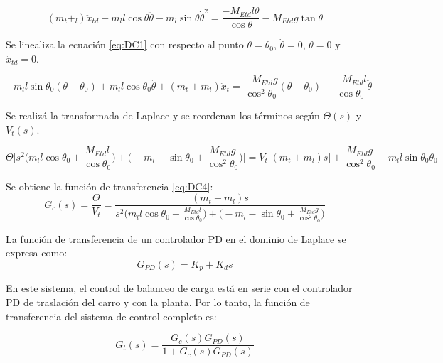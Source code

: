 \documentclass{article}
\begin{document}
        \begin{equation} \label{eq:DC1}
            (m_t+_l)\ddot{x}_{td}+m_ll\cos{\theta}\ddot{\theta}-m_l\sin{\theta}\dot{\theta}^2=\frac{-M_{Etd}l\ddot{\theta}}{\cos{\theta}}-M_{Etd}g\tan{\theta}
        \end{equation}

        Se linealiza la ecuación \ref{eq:DC1} con respecto al punto \(\theta=\theta_0\), \(\dot{\theta}=0\), \(\ddot{\theta}=0\) y \(\ddot{x}_{td}=0\).

        \begin{equation} \label{eq:DC2}
            -m_ll\sin{\theta_0}(\theta-\theta_0)+m_ll\cos{\theta_0}\ddot{\theta}+(m_t+m_l)\ddot{x}_t=\frac{-M_{Etd}g}{\cos^2{\theta_0}}(\theta-\theta_0)-\frac{-M_{Etd}l}{\cos{\theta_0}}\ddot{\theta}
        \end{equation}

        Se realizá la transformada de Laplace y se reordenan los términos según \(\Theta(s)\) y \(V_t(s)\).

        \begin{equation} \label{eq:DC3}
            \Theta\bigg[s^2\bigg( m_ll\cos{\theta_0}+\frac{M_{Etd}l}{\cos{\theta_0}}\bigg) + \bigg( -m_l-\sin{\theta_0}+\frac{M_{Etd}g}{\cos^2{\theta_0}} \bigg) \bigg]= V_t \bigg[(m_t+m_l)s\bigg]+\frac{M_{Etd}g}{\cos^2{\theta_0}}-m_ll\sin{\theta_0}\theta_0
        \end{equation}

        Se obtiene la función de transferencia \ref{eq:DC4}:
        \begin{equation} \label{eq:DC4}
            G_c(s)=\frac{\Theta}{V_t}=\frac{(m_t+m_l)s}{s^2\bigg( m_ll\cos{\theta_0}+\frac{M_{Etd}l}{\cos{\theta_0}}\bigg) + \bigg( -m_l-\sin{\theta_0}+\frac{M_{Etd}g}{\cos^2{\theta_0}}\bigg) }
        \end{equation}

        La función de transferencia de un controlador PD en el dominio de Laplace se expresa como:
        \begin{equation}
            G_{PD}(s) = K_p + K_d s
        \end{equation}

        En este sistema, el control de balanceo de carga está en serie con el controlador PD de traslación del carro y con la planta. Por lo tanto, la función de transferencia del sistema de control completo es:

        \begin{equation} \label{eq:DC5}
            G_t(s) = \frac{G_{c}(s) G_{PD}(s)}{1 + G_{c}(s) G_{PD}(s)}
        \end{equation}
\end{document}
